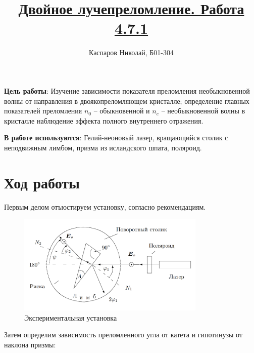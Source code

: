 \documentclass[a4paper]{article}
\title{\underline{Двойное лучепреломление. Работа 4.7.1}}
\author{Каспаров Николай, Б01-304}
\begin{document}
\maketitle

\textbf{Цель работы}:
    Изучение зависимости показателя преломления необыкновенной волны от направления в двоякопреломляющем кристалле; определение главных показателей преломления $n_0$ -- обыкновенной и $n_e$ -- необыкновенной волны в кристалле наблюдение эффекта полного внутреннего отражения.

\textbf{В работе используются}:
    Гелий-неоновый лазер, вращающийся столик с неподвижным лимбом, призма из исландского шпата, поляроид.

\section{Ход работы}

Первым делом отъюстируем установку, согласно рекомендациям.

\begin{figure}[!h]
\centering
\includegraphics[width=0.8\textwidth]{1.png}
\caption{Экспериментальная установка}
\label{}
\end{figure}

Затем определим зависимость преломленного угла от катета и гипотинузы от наклона призмы:
\end{document}
